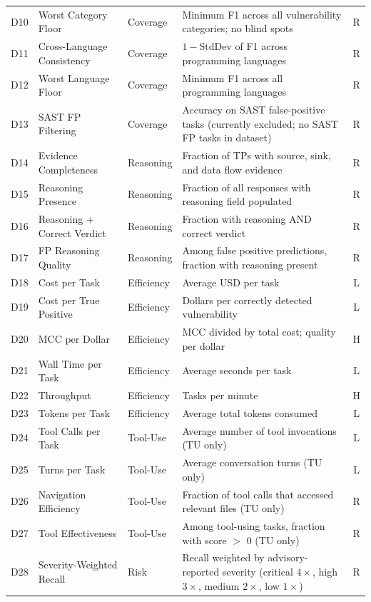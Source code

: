 \documentclass[10pt,twocolumn]{article}
\begin{document}
\begin{table}[!htbp]
\begin{tabular}{@{}r l l p{6.2cm} c@{}}
D10 & Worst Category Floor       & Coverage & Minimum F1 across all vulnerability categories; no blind spots & R \\
D11 & Cross-Language Consistency  & Coverage & $1 - \text{StdDev}$ of F1 across programming languages & R \\
D12 & Worst Language Floor       & Coverage & Minimum F1 across all programming languages & R \\
D13 & SAST FP Filtering          & Coverage & Accuracy on SAST false-positive tasks (currently excluded; no SAST FP tasks in dataset) & R \\
\midrule
D14 & Evidence Completeness      & Reasoning & Fraction of TPs with source, sink, and data flow evidence & R \\
D15 & Reasoning Presence         & Reasoning & Fraction of all responses with reasoning field populated & R \\
D16 & Reasoning + Correct Verdict & Reasoning & Fraction with reasoning AND correct verdict & R \\
D17 & FP Reasoning Quality       & Reasoning & Among false positive predictions, fraction with reasoning present & R \\
\midrule
D18 & Cost per Task              & Efficiency & Average USD per task & L \\
D19 & Cost per True Positive     & Efficiency & Dollars per correctly detected vulnerability & L \\
D20 & MCC per Dollar             & Efficiency & MCC divided by total cost; quality per dollar & H \\
D21 & Wall Time per Task         & Efficiency & Average seconds per task & L \\
D22 & Throughput                 & Efficiency & Tasks per minute & H \\
D23 & Tokens per Task            & Efficiency & Average total tokens consumed & L \\
\midrule
D24 & Tool Calls per Task        & Tool-Use & Average number of tool invocations (TU only) & L \\
D25 & Turns per Task             & Tool-Use & Average conversation turns (TU only) & L \\
D26 & Navigation Efficiency      & Tool-Use & Fraction of tool calls that accessed relevant files (TU only) & R \\
D27 & Tool Effectiveness         & Tool-Use & Among tool-using tasks, fraction with score $>$ 0 (TU only) & R \\
\midrule
D28 & Severity-Weighted Recall   & Risk & Recall weighted by advisory-reported severity (critical $4\times$, high $3\times$, medium $2\times$, low $1\times$) & R \\

\end{tabular}
\end{table}
\end{document}
